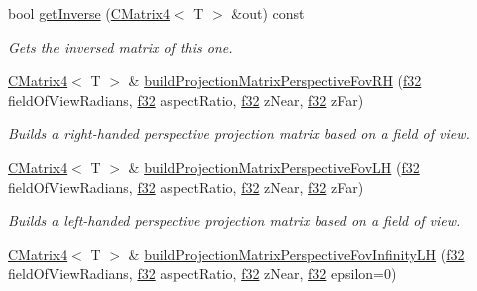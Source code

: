 \begin{DoxyCompactItemize}
bool \hyperlink{classirr_1_1core_1_1CMatrix4_a323bfa0e327636c9cd4a5d2b781b3a60}{get\+Inverse} (\hyperlink{classirr_1_1core_1_1CMatrix4}{C\+Matrix4}$<$ T $>$ \&out) const
\begin{DoxyCompactList}\small\item\em Gets the inversed matrix of this one. \end{DoxyCompactList}\item 
\mbox{\label{classirr_1_1core_1_1CMatrix4_a5bea6c6f5479720841cea61651e35879}} 
\hyperlink{classirr_1_1core_1_1CMatrix4}{C\+Matrix4}$<$ T $>$ \& \hyperlink{classirr_1_1core_1_1CMatrix4_a5bea6c6f5479720841cea61651e35879}{build\+Projection\+Matrix\+Perspective\+Fov\+RH} (\hyperlink{namespaceirr_a0277be98d67dc26ff93b1a6a1d086b07}{f32} field\+Of\+View\+Radians, \hyperlink{namespaceirr_a0277be98d67dc26ff93b1a6a1d086b07}{f32} aspect\+Ratio, \hyperlink{namespaceirr_a0277be98d67dc26ff93b1a6a1d086b07}{f32} z\+Near, \hyperlink{namespaceirr_a0277be98d67dc26ff93b1a6a1d086b07}{f32} z\+Far)
\begin{DoxyCompactList}\small\item\em Builds a right-\/handed perspective projection matrix based on a field of view. \end{DoxyCompactList}\item 
\mbox{\label{classirr_1_1core_1_1CMatrix4_a1895b967a8f8c9d7ad90fe5434f2499f}} 
\hyperlink{classirr_1_1core_1_1CMatrix4}{C\+Matrix4}$<$ T $>$ \& \hyperlink{classirr_1_1core_1_1CMatrix4_a1895b967a8f8c9d7ad90fe5434f2499f}{build\+Projection\+Matrix\+Perspective\+Fov\+LH} (\hyperlink{namespaceirr_a0277be98d67dc26ff93b1a6a1d086b07}{f32} field\+Of\+View\+Radians, \hyperlink{namespaceirr_a0277be98d67dc26ff93b1a6a1d086b07}{f32} aspect\+Ratio, \hyperlink{namespaceirr_a0277be98d67dc26ff93b1a6a1d086b07}{f32} z\+Near, \hyperlink{namespaceirr_a0277be98d67dc26ff93b1a6a1d086b07}{f32} z\+Far)
\begin{DoxyCompactList}\small\item\em Builds a left-\/handed perspective projection matrix based on a field of view. \end{DoxyCompactList}\item 
\mbox{\label{classirr_1_1core_1_1CMatrix4_a3e4c3f6c545dd522f9f09177259f2f18}} 
\hyperlink{classirr_1_1core_1_1CMatrix4}{C\+Matrix4}$<$ T $>$ \& \hyperlink{classirr_1_1core_1_1CMatrix4_a3e4c3f6c545dd522f9f09177259f2f18}{build\+Projection\+Matrix\+Perspective\+Fov\+Infinity\+LH} (\hyperlink{namespaceirr_a0277be98d67dc26ff93b1a6a1d086b07}{f32} field\+Of\+View\+Radians, \hyperlink{namespaceirr_a0277be98d67dc26ff93b1a6a1d086b07}{f32} aspect\+Ratio, \hyperlink{namespaceirr_a0277be98d67dc26ff93b1a6a1d086b07}{f32} z\+Near, \hyperlink{namespaceirr_a0277be98d67dc26ff93b1a6a1d086b07}{f32} epsilon=0)

\end{DoxyCompactItemize}
